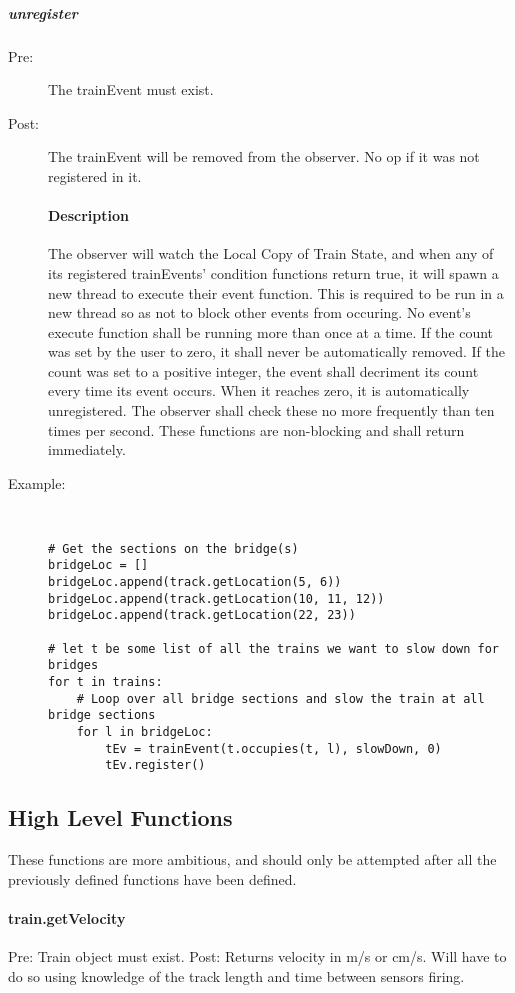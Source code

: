 \documentclass[a4paper,11pt,notitlepage]{article}
\def\LC{Local Copy of Train State\xspace}
\begin{document}
\subparagraph{unregister}
\begin{description}
\item[\hspace{1cm}Pre:] The trainEvent must exist.
\item[\hspace{1cm}Post:] The trainEvent will be removed from the observer. No op if it was not registered in it.
\paragraph{Description}
The observer will watch the \LC, and when any of its registered trainEvents' condition functions return true, it will spawn a new thread to execute their event function. This is required to be run in a new thread so as not to block other events from occuring. No event's execute function shall be running more than once at a time. If the count was set by the user to zero, it shall never be automatically removed. If the count was set to a positive integer, the event shall decriment its count every time its event occurs. When it reaches zero, it is automatically unregistered. The observer shall check these no more frequently than ten times per second.
These functions are non-blocking and shall return immediately.
\item[\hspace{1cm}Example:]
\begin{verbatim}


# Get the sections on the bridge(s)
bridgeLoc = []
bridgeLoc.append(track.getLocation(5, 6))
bridgeLoc.append(track.getLocation(10, 11, 12))
bridgeLoc.append(track.getLocation(22, 23))

# let t be some list of all the trains we want to slow down for bridges
for t in trains:
    # Loop over all bridge sections and slow the train at all bridge sections
    for l in bridgeLoc:
        tEv = trainEvent(t.occupies(t, l), slowDown, 0)
        tEv.register()
\end{verbatim}
\end{description}


\subsection{High Level Functions}
These functions are more ambitious, and should only be attempted after all the previously defined functions have been defined.
\paragraph{train.getVelocity} Pre: Train object must exist. Post: Returns velocity in m/s or cm/s. Will have to do so using knowledge of the track length and time between sensors firing.
\end{document}
